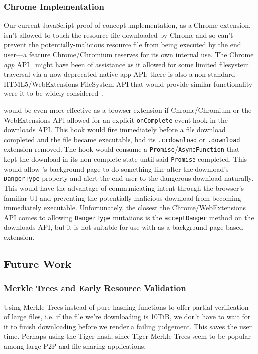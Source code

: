 \subsubsection{Chrome Implementation}

Our current JavaScript proof-of-concept implementation, as a Chrome extension,
isn't allowed to touch the resource file downloaded by Chrome and so can't
prevent the potentially-malicious resource file from being executed by the end
user—a feature Chrome/Chromium reserves for its own internal use. The Chrome
\textit{app} API~\cite{AppAPI} might have been of assistance as it allowed for
some limited filesystem traversal via a now deprecated native app API; there is
also a non-standard HTML5/WebExtensions FileSystem API that would provide
similar functionality were it to be widely considered~\cite{deadSpec}.

\SYSTEM{} would be even more effective as a browser extension if Chrome/Chromium
or the WebExtensions API allowed for an explicit \texttt{onComplete} event hook
in the downloads API. This hook would fire immediately before a file download
completed and the file became executable, \ie had its \texttt{.crdownload} or
\texttt{.download} extension removed. The hook would consume a
\texttt{Promise}/\texttt{AsyncFunction} that kept the download in its
non-complete state until said \texttt{Promise} completed. This would allow
\SYSTEM{}'s background page to do something like alter the download's
\texttt{DangerType} property and alert the end user to the dangerous download
naturally. This would have the advantage of communicating intent through the
browser's familiar UI and preventing the potentially-malicious download from
becoming immediately executable. Unfortunately, the closest the
Chrome/WebExtensions API comes to allowing \texttt{DangerType} mutations is the
\texttt{acceptDanger} method on the downloads API, but it is not suitable for
use with \SYSTEM{} as a background page based extension.

\subsection{Future Work}

\subsubsection{Merkle Trees and Early Resource Validation}

Using Merkle Trees instead of pure hashing functions to offer partial
verification of large files, i.e. if the file we're downloading is 10TiB, we
don't have to wait for it to finish downloading before we render a failing
judgement. This saves the user time. Perhaps using the Tiger hash, since Tiger
Merkle Trees seem to be popular among large P2P and file sharing applications.

